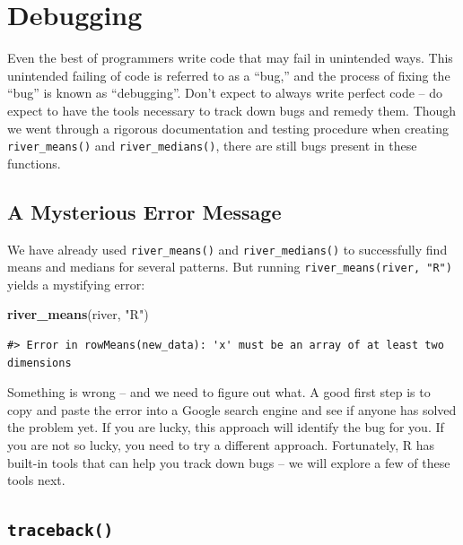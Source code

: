 \documentclass[
]{book}
\newenvironment{Shaded}{\begin{snugshade}}{\end{snugshade}}
\newcommand{\KeywordTok}[1]{\textcolor[rgb]{0.13,0.29,0.53}{\textbf{#1}}}
\newcommand{\NormalTok}[1]{#1}
\newcommand{\StringTok}[1]{\textcolor[rgb]{0.31,0.60,0.02}{#1}}
\begin{document}
\hypertarget{debugging}{%
\section{Debugging}\label{debugging}}

Even the best of programmers write code that may fail in unintended ways. This unintended failing of code is referred to as a ``bug,'' and the process of fixing the ``bug'' is known as ``debugging''. Don't expect to always write perfect code -- do expect to have the tools necessary to track down bugs and remedy them. Though we went through a rigorous documentation and testing procedure when creating \texttt{river\_means()} and \texttt{river\_medians()}, there are still bugs present in these functions.

\hypertarget{error-onematch}{%
\subsection{A Mysterious Error Message}\label{error-onematch}}

We have already used \texttt{river\_means()} and \texttt{river\_medians()} to successfully find means and medians for several patterns. But running \texttt{river\_means(river,\ "R")} yields a mystifying error:

\begin{Shaded}
\begin{Highlighting}[]
\KeywordTok{river_means}\NormalTok{(river, }\StringTok{"R"}\NormalTok{)}
\end{Highlighting}
\end{Shaded}

\begin{verbatim}
#> Error in rowMeans(new_data): 'x' must be an array of at least two dimensions
\end{verbatim}

Something is wrong -- and we need to figure out what. A good first step is to copy and paste the error into a Google search engine and see if anyone has solved the problem yet. If you are lucky, this approach will identify the bug for you. If you are not so lucky, you need to try a different approach. Fortunately, R has built-in tools that can help you track down bugs -- we will explore a few of these tools next.

\hypertarget{traceback}{%
\subsection{\texorpdfstring{\texttt{traceback()}}{traceback()}}\label{traceback}}
\end{document}
